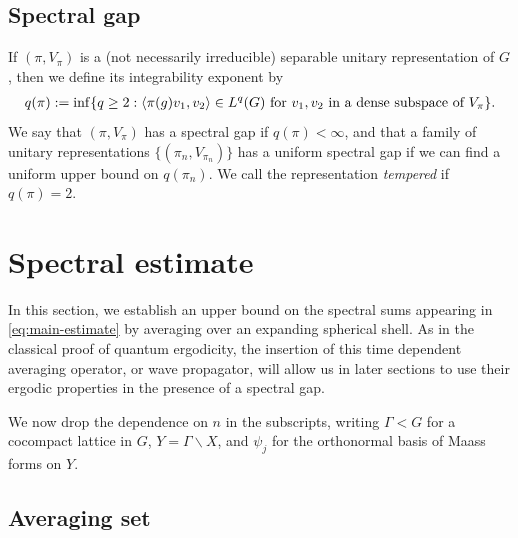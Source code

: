 \documentclass[12pt]{amsart}
\theoremstyle{remark}
\begin{document}
\subsection{Spectral gap}\label{sec:SG}
If $(\pi, V_{\pi})$ is a (not necessarily irreducible) separable unitary representation of $G$, then we define its integrability exponent by
\begin{gather*}
    q(\pi) := \inf\{q \ge 2 : \langle \pi(g) v_1, v_2 \rangle \in L^q(G) \textnormal{ for $v_1, v_2$ in a dense subspace of $V_{\pi}$}\}.
\end{gather*}
We say that $(\pi, V_{\pi})$ has a spectral gap if $q(\pi) < \infty$, and that a family of unitary representations $\{(\pi_n, V_{\pi_n})\}$ has a uniform spectral gap if we can find a uniform upper bound on $q(\pi_n)$. We call the representation \textit{tempered} if $q(\pi)=2$. 

\section{Spectral estimate}\label{sec:spectral-estimate}


In this section, we establish an upper bound on the spectral sums appearing in \eqref{eq:main-estimate} by averaging over an expanding spherical shell. As in the classical proof of quantum ergodicity, the insertion of this time dependent averaging operator, or wave propagator, will allow us in later sections to use their ergodic properties in the presence of a spectral gap.

We now drop the dependence on $n$ in the subscripts, writing $\Gamma<G$ for a cocompact lattice in $G$, $Y=\Gamma\backslash X$, and $\psi_j$ for the orthonormal basis of Maass forms on $Y$. 

\subsection{Averaging set}\label{sec:av-set}
\end{document}
